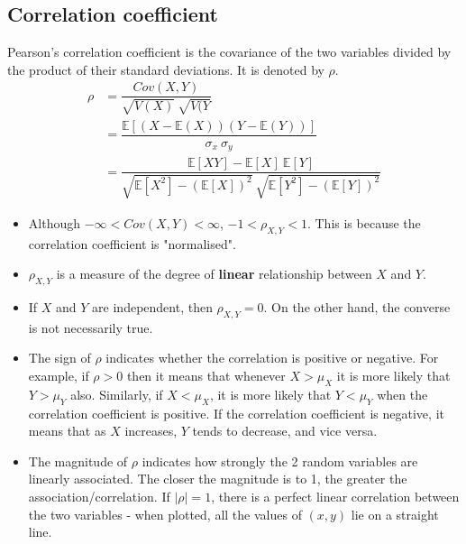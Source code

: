 \subsection{Correlation coefficient}
\begin{definition}
Pearson's correlation coefficient is the covariance of the two variables divided by the product of their standard deviations. It is denoted by $\rho$.
\begin{equation*}
\begin{split}
    \rho &= \dfrac{Cov(X,Y)}{\sqrt{V(X)}\ \sqrt{V(Y}} \\
        &= \dfrac{\mathbb{E}[(X - \mathbb{E}(X))(Y - \mathbb{E}(Y))]}{\sigma_x\  \sigma_y} \\
        &= \dfrac{\mathbb{E}[XY] - \mathbb{E}[X]\  \mathbb{E}[Y]}{\sqrt{\mathbb{E}[X^2] - (\mathbb{E}[X])^2}\ \sqrt{\mathbb{E}[Y^2] - (\mathbb{E}[Y])^2}}
\end{split}
\end{equation*}
\end{definition}

\begin{note}[Remarks]
\end{note}
\begin{itemize}
    \item Although $-\infty < Cov(X,Y) < \infty$, $-1 < \rho_{X,Y} < 1$. This is because the correlation coefficient is "normalised".
    \item $\rho_{X,Y}$ is a measure of the degree of \textbf{linear} relationship between $X$ and $Y$.
    \item If $X$ and $Y$ are independent, then $\rho_{X,Y} = 0$. On the other hand, the converse is not necessarily true.
    \item The sign of $\rho$ indicates whether the correlation is positive or negative. For example, if $\rho > 0$ then it means that whenever $X > \mu_X$ it is more likely that $Y > \mu_Y$ also. Similarly, if $X < \mu_X$, it is more likely that $Y < \mu_Y$ when the correlation coefficient is positive. If the correlation coefficient is negative, it means that as $X$ increases, $Y$ tends to decrease, and vice versa. 
    \item The magnitude of $\rho$ indicates how strongly the 2 random variables are linearly associated. The closer the magnitude is to 1, the greater the association/correlation. If $|\rho| = 1$, there is a perfect linear correlation between the two variables - when plotted, all the values of $(x,y)$ lie on a straight line. 
\end{itemize}